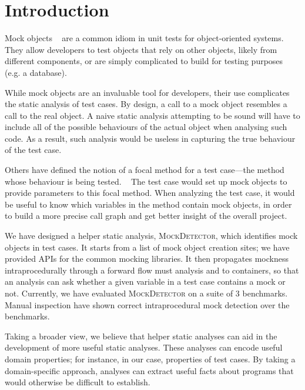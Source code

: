 \section{Introduction}
\label{sec:introduction}

Mock objects ~\cite{beck02:_test_driven_devel} are a common idiom in
unit tests for object-oriented systems.  They allow developers to test objects that 
rely on other objects, likely from different components, or are simply complicated 
to build for testing purposes (e.g. a database).

While mock objects are an invaluable tool for developers, their use
complicates the static analysis of test cases. 
By design, a call to a mock object resembles a call to the real object. 
A naive static analysis attempting to be sound will have to include all of 
the possible behaviours of the actual object when analysing such code. 
As a result, such analysis would be useless in capturing the true behaviour 
of the test case.

Others have defined the notion of a focal method for a test case---the method
whose behaviour is being tested. ~\cite{7335402}
The test case would set up mock objects to provide parameters to this focal method.
When analyzing the test case, it would be useful to know which variables in the
method contain mock objects, in order to build a more precise call graph and get 
better insight of the overall project.

We have designed a helper static analysis, \textsc{MockDetector}, which identifies
mock objects in test cases. It starts from a list of mock object creation sites; we
have provided APIs for the common mocking libraries. It then propagates mockness
intraprocedurally through a forward flow must analysis and to containers, so that an analysis
can ask whether a given variable in a test case contains a mock or not. Currently, we have
evaluated \textsc{MockDetector} on a suite of 3 benchmarks. Manual inspection have shown 
correct intraprocedural mock detection over the benchmarks. 

Taking a broader view, we believe that helper static analyses can aid
in the development of more useful static analyses. These analyses can
encode useful domain properties; for instance, in our case, properties
of test cases. By taking a domain-specific approach, analyses can extract
useful facts about programs that would otherwise be difficult to establish.

